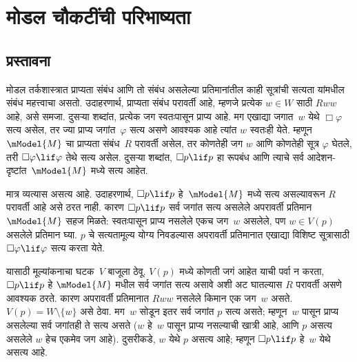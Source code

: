 \chapter{मोडल चौकटींची परिभाष्यता}\label{nml:frd:chap}









\section{प्रस्तावना}\label{nml:frd:int:sec}

मोडल तर्कशास्त्रात प्राप्यता संबंध आणि तो संबंध असलेल्या
प्रतिमानांतील काही सूत्रांची सत्यता यांमधील संबंध
महत्त्वाचा असतो. उदाहरणार्थ, प्राप्यता संबंध परावर्ती
आहे, म्हणजे प्रत्येक $w
\in W$ साठी $Rww$ आहे, असे समजा. दुसऱ्या शब्दांत,
प्रत्येक जग स्वतःपासून प्राप्य आहे. मग एखाद्या जगात~$w$
येथे $\Box \varphi$ सत्य असेल, तर ज्या प्राप्य जगांत~$\varphi$
सत्य असणे आवश्यक आहे त्यांत $w$ स्वतःही येते. म्हणून
$\mModel{M}$ चा प्राप्यता संबंध~$R$ परावर्ती असेल, तर
कोणतेही जग $w$ आणि कोणतेही सूत्र $\varphi$ घेतले, तरी
$\Box \varphi
\lif \varphi$ तेथे सत्य असेल. दुसऱ्या शब्दांत, $\Box p \lif
p$ हा रूपबंध आणि त्याचे सर्व आदेशन-दृष्टांत~$\mModel{M}$
मध्ये सत्य आहेत.

मात्र व्यत्यास असत्य आहे. उदाहरणार्थ, $\Box p \lif p$
हे~$\mModel{M}$ मध्ये सत्य असल्यावरून $R$ परावर्ती आहे
असे ठरत नाही. कारण $\Box p \lif
p$ सर्व जगांत सत्य असलेले अपरावर्ती प्रतिमान~$\mModel{M}$
सहज मिळते: स्वतःपासून प्राप्य नसलेले एकच जग~$w$ असलेले,
पण $w \in V(p)$ असलेले प्रतिमान घ्या. $p$ चे सत्यतामूल्य
योग्य निवडल्यास अपरावर्ती प्रतिमानात एखाद्या विशिष्ट
सूत्रासाठी $\Box \varphi \lif \varphi$ सत्य करता येते.

यासाठी मूल्यांकनाचा घटक~$V$ बाजूला ठेवू. $V(p)$ मध्ये
कोणती जगं आहेत याची पर्वा न करता, $\Box p \lif p$ हे
$\mModel{M}$ मधील सर्व जगांत सत्य असावे अशी अट घातल्यास
$R$ परावर्ती असणे आवश्यक ठरते. कारण अपरावर्ती
प्रतिमानात $Rww$ नसलेले किमान एक जग~$w$ असते.
$V(p) =
W \setminus \{w\}$ असे ठेवा. मग~$w$ सोडून इतर
सर्व जगांत $p$ सत्य असते; म्हणून~$w$ पासून प्राप्य
असलेल्या सर्व जगांतही ते सत्य असते ($w$ हे~$w$ पासून
प्राप्य नसल्याची खात्री आहे, आणि $p$ असत्य असलेले
$w$ हेच एकमेव जग आहे). दुसरीकडे, $w$ येथे $p$ असत्य
आहे; म्हणून $\Box
p \lif p$ हे~$w$ येथे असत्य आहे.

